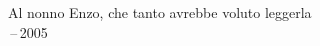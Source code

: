 \thispagestyle{empty}
{}

\vspace*{3cm}

\begin{center}
    Al nonno Enzo, che tanto avrebbe voluto leggerla \\ \,--\,2005
\end{center}
